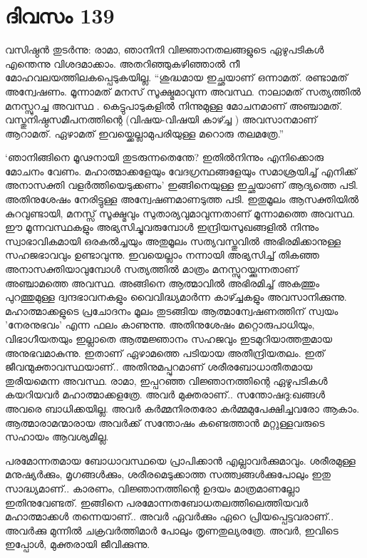 \newpage
\section{ദിവസം 139}


വസിഷ്ഠൻ തുടർന്നു: രാമാ, ഞാനിനി വിജ്ഞാനതലങ്ങളുടെ ഏഴുപടികൾ എന്തെന്നു വിശദമാക്കാം. അതറിഞ്ഞുകഴിഞ്ഞാൽ നീ മോഹവലയത്തിലകപ്പെടുകയില്ല. “ശുദ്ധമായ ഇച്ഛയാണ്‌ ഒന്നാമത്. രണ്ടാമത് അന്വേഷണം. മൂന്നാമത് മനസ് സൂക്ഷ്മമാവുന്ന അവസ്ഥ. നാലാമത് സത്യത്തിൽ മനസ്സുറച്ച അവസ്ഥ . കെട്ടുപാടുകളിൽ നിന്നുമുള്ള മോചനമാണ്‌ അഞ്ചാമത്. വസ്തുനിഷ്ഠസമീപനത്തിന്റെ (വിഷയ-വിഷയി കാഴ്ച്ച ) അവസാനമാണ്‌ ആറാമത്. ഏഴാമത് ഇവയ്ക്കെല്ലാമുപരിയുള്ള മറൊരു തലമത്രേ.”

‘ഞാനിങ്ങിനെ മൂഢനായി തുടരുന്നതെന്തേ? ഇതില്‍നിന്നും എനിക്കൊരു മോചനം വേണം. മഹാത്മാക്കളേയും വേദഗ്രന്ഥങ്ങളേയും സമാശ്രയിച്ച് എനിക്ക് അനാസക്തി വളർത്തിയെടുക്കണം’ ഇങ്ങിനെയുള്ള ഇച്ഛയാണ്‌ ആദ്യത്തെ പടി. അതിനുശേഷം നേരിട്ടുള്ള അന്വേഷണമാണടുത്ത പടി. ഇതുമൂലം ആസക്തിയിൽ കുറവുണ്ടായി, മനസ്സ് സൂക്ഷ്മവും സുതാര്യവുമാവുന്നതാണ്‌ മൂന്നാമത്തെ അവസ്ഥ. ഈ മൂന്നവസ്ഥകളും അഭ്യസിച്ചുവരുമ്പോൾ ഇന്ദ്രിയസുഖങ്ങളിൽ നിന്നും സ്വാഭാവികമായി ഒരകൽച്ചയും അതുമൂലം സത്യവസ്തുവിൽ അഭിരമിക്കാനുള്ള സഹജഭാവവും ഉണ്ടാവുന്നു. ഇവയെല്ലാം നന്നായി അഭ്യസിച്ച് തികഞ്ഞ അനാസക്തിയാവുമ്പോൾ സത്യത്തിൽ മാത്രം മനസ്സുറയ്ക്കുന്നതാണ്‌ അഞ്ചാമത്തെ അവസ്ഥ. അങ്ങിനെ ആത്മാവിൽ അഭിരമിച്ച് അകത്തും പുറത്തുമുള്ള ദ്വന്ദഭാവനകളും വൈവിദ്ധ്യമാര്‍ന്ന  കാഴ്ച്ചകളും അവസാനിക്കുന്നു. മഹാത്മാക്കളുടെ പ്രചോദനം മൂലം തുടങ്ങിയ ആത്മാന്വേഷണത്തിന്‌ സ്വയം 'നേരനുഭവം' എന്ന ഫലം കാണുന്നു. അതിനുശേഷം മറ്റൊരുപാധിയും, വിഭാഗീയതയും ഇല്ലാതെ ആത്മജ്ഞാനം സഹജവും ഇടമുറിയാത്തതുമായ അനുഭവമാകുന്നു. ഇതാണ്‌ ഏഴാമത്തെ പടിയായ അതീന്ദ്രിയതലം. ഇത് ജീവന്മുക്താവസ്ഥയാണ്‌.. അതിനുമപ്പുറമാണ്‌ ശരീരബോധാതീതമായ തുരീയമെന്ന അവസ്ഥ. രാമാ, ഇപ്പറഞ്ഞ വിജ്ഞാനത്തിന്റെ ഏഴുപടികൾ കയറിയവർ മഹാത്മാക്കളത്രേ. അവർ മുക്തരാണ്‌.. സന്തോഷദു:ഖങ്ങൾ അവരെ ബാധിക്കയില്ല. അവർ കർമ്മനിരതരോ കർമ്മമുപേക്ഷിച്ചവരോ ആകാം. ആത്മാരാമന്മാരായ അവർക്ക് സന്തോഷം കണ്ടെത്താൻ മറ്റുള്ളവരുടെ സഹായം ആവശ്യമില്ല.

പരമോന്നതമായ ബോധാവസ്ഥയെ പ്രാപിക്കാൻ എല്ലാവർക്കുമാവും. ശരീരമുള്ള മനുഷ്യർക്കും, മൃഗങ്ങൾക്കും, ശരീരമെടുക്കാത്ത സത്ത്വങ്ങൾക്കുപോലും ഇതു സാദ്ധ്യമാണ്‌.. കാരണം, വിജ്ഞാനത്തിന്റെ ഉദയം മാത്രമാണല്ലോ ഇതിനുവേണ്ടത്. ഇങ്ങിനെ പരമോന്നതബോധതലത്തിലെത്തിയവർ മഹാത്മാക്കൾ തന്നെയാണ്‌.. അവർ ഏവര്‍ക്കും ഏറെ പ്രിയപ്പെട്ടവരാണ്‌.. അവർക്കു മുന്നിൽ ചക്രവർത്തിമാർ പോലും തൃണതുല്യരത്രേ. അവർ, ഇവിടെ ഇപ്പോൾ, മുക്തരായി ജീവിക്കുന്നു. 


